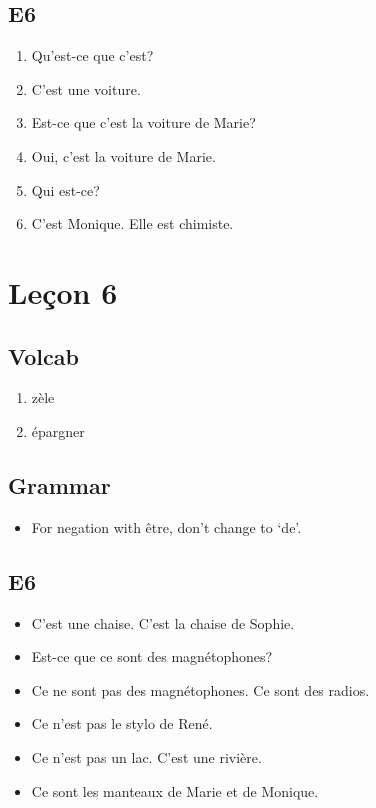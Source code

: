 \documentclass{book}
\begin{document}
    \section{E6}
        \begin{enumerate}
            \item Qu'est-ce que c'est?
            \item C'est une voiture.
            \item Est-ce que c'est la voiture de Marie?
            \item Oui, c'est la voiture de Marie.
            \item Qui est-ce?
            \item C'est Monique. Elle est chimiste.
        \end{enumerate}

\chapter{Leçon 6}   
    \section{Volcab}
        \begin{enumerate}
            \item zèle
            \item épargner
        \end{enumerate}

    \section{Grammar}
        \begin{itemize}
            \item For negation with être, don't change to `de'.
        \end{itemize}

    \section{E6}
        \begin{itemize}
            \item C'est une chaise. C'est la chaise de Sophie.
            \item Est-ce que ce sont des magnétophones?
            \item Ce ne sont pas des magnétophones. Ce sont des radios.
            \item Ce n'est pas le stylo de René.
            \item Ce n'est pas un lac. C'est une rivière.
            \item Ce sont les manteaux de Marie et de Monique.
        \end{itemize}
\end{document}
